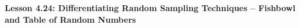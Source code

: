 \begin{center}
\textbf{Lesson 4.24: Differentiating Random Sampling Techniques -- Fishbowl and Table of Random Numbers}
\end{center}

\vspace*{-1.5ex}

